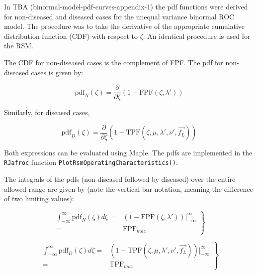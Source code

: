 \documentclass[
]{book}
\begin{document}
In TBA (binormal-model-pdf-curves-appendix-1) the pdf functions were derived for non-diseased and diseased cases for the unequal variance binormal ROC model. The procedure was to take the derivative of the appropriate cumulative distribution function (CDF) with respect to \(\zeta\). An identical procedure is used for the RSM.

The CDF for non-diseased cases is the complement of FPF. The pdf for non-diseased cases is given by:

\begin{equation}
\text{pdf}_N\left ( \zeta \right ) = \frac{\partial }{\partial \zeta} \left ( 1-\text{FPF}\left (\zeta , \lambda'\right ) \right ) 
\label{eq:rsm-pred-pdf-n}
\end{equation}

Similarly, for diseased cases,

\begin{equation}
\text{pdf}_D\left ( \zeta \right ) = \frac{\partial }{\partial \zeta} \left ( 1-\text{TPF}\left (\zeta , \mu, \lambda', \nu', \overrightarrow{f_L} \right ) \right ) 
\label{eq:rsm-pred-pdf-d}
\end{equation}

Both expressions can be evaluated using Maple. The pdfs are implemented in the \texttt{RJafroc} function \texttt{PlotRsmOperatingCharacteristics()}.

The integrals of the pdfs (non-diseased followed by diseased) over the entire allowed range are given by (note the vertical bar notation, meaning the difference of two limiting values):

\begin{equation}
\left. 
\begin{aligned}
\int_{-\infty}^{\infty}\text{pdf}_N \left ( \zeta \right )d \zeta =& \left ( 1-\text{FPF}\left (\zeta , \lambda'\right ) \right ) \bigg \rvert_{-\infty}^{\infty}\\
=& \text{FPF}_{max}
\end{aligned}
\right \}
\label{eq:rsm-pred-int-pdf-n}
\end{equation}

\begin{equation}
\left. 
\begin{aligned}
\int_{-\infty}^{\infty}\text{pdf}_D \left ( \zeta \right )d \zeta =& \left ( 1-\text{TPF}\left (\zeta , \mu, \lambda', \nu', \overrightarrow{f_L} \right ) \right ) \bigg \rvert_{-\infty}^{\infty}\\
=& \text{TPF}_{max}
\end{aligned}
\right \}
\label{eq:rsm-pred-int-pdf-d}
\end{equation}
\end{document}
